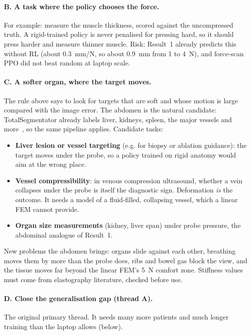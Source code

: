 \documentclass[10pt,a4paper,twocolumn]{article}
\begin{document}
\paragraph{B. A task where the policy chooses the force.} For example: measure the muscle thickness, scored
against the uncompressed truth. A rigid-trained policy is never penalised for pressing hard, so it should press
harder and measure thinner muscle. Risk: Result~1 already predicts this without RL (about 0.3~mm/N, so about 0.9~mm
from 1 to 4~N), and force-scan PPO did not beat random at laptop scale.

\paragraph{C. A softer organ, where the target moves.} The rule above says to look for targets that are soft and
whose motion is large compared with the image error. The abdomen is the natural candidate: TotalSegmentator already
labels liver, kidneys, spleen, the major vessels and more~\cite{totalseg}, so the same pipeline applies. Candidate
tasks:
\begin{itemize}
  \item \textbf{Liver lesion or vessel targeting} (e.g. for biopsy or ablation guidance): the target moves under the
    probe, so a policy trained on rigid anatomy would aim at the wrong place.
  \item \textbf{Vessel compressibility}: in venous compression ultrasound, whether a vein collapses under the probe
    is itself the diagnostic sign. Deformation \emph{is} the outcome. It needs a model of a fluid-filled, collapsing
    vessel, which a linear FEM cannot provide.
  \item \textbf{Organ size measurements} (kidney, liver span) under probe pressure, the abdominal analogue of
    Result~1.
\end{itemize}
New problems the abdomen brings: organs slide against each other, breathing moves them by more than the probe
does, ribs and bowel gas block the view, and the tissue moves far beyond the linear FEM's 5~N comfort zone. Stiffness
values must come from elastography literature, checked before use.

\paragraph{D. Close the generalisation gap (thread A).} The original primary thread. It needs many more patients
and much longer training than the laptop allows (below).
\end{document}
